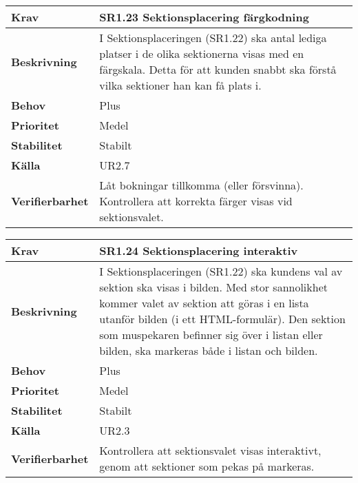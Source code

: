 \documentclass[a4paper, twoside, 11pt, titlepage]{article}
\begin{document}
	\begin{tabular} { p{2.6cm} p{12.5cm} }
		\hline
		\sffamily\textbf{Krav} & \sffamily\textbf{SR1.23 Sektionsplacering färgkodning } \\
		\hline
		\sffamily\textbf{Beskrivning} & I Sektionsplaceringen (SR1.22) ska antal lediga platser i de olika sektionerna visas med en färgskala. Detta för att kunden snabbt ska förstå vilka sektioner han kan få plats i.  \\
		\hline
		\sffamily\textbf{Behov} & Plus  \\
		\hline
		\sffamily\textbf{Prioritet} & Medel  \\
		\hline
		\sffamily\textbf{Stabilitet} & Stabilt  \\
		\hline
		\sffamily\textbf{Källa} & UR2.7  \\
		\hline
		\sffamily\textbf{Verifierbarhet} & Låt bokningar tillkomma (eller försvinna). Kontrollera att korrekta färger visas vid sektionsvalet.  \\
		\hline
	\end{tabular}
	\vspace{6mm}

	\begin{tabular} { p{2.6cm} p{12.5cm} }
		\hline
		\sffamily\textbf{Krav} & \sffamily\textbf{SR1.24 Sektionsplacering interaktiv } \\
		\hline
		\sffamily\textbf{Beskrivning} & I Sektionsplaceringen (SR1.22) ska kundens val av sektion ska visas i bilden. Med stor sannolikhet kommer valet av sektion att göras i en lista utanför bilden (i ett HTML-formulär). Den sektion som muspekaren befinner sig över i listan eller bilden, ska markeras både i listan och bilden.  \\
		\hline
		\sffamily\textbf{Behov} & Plus  \\
		\hline
		\sffamily\textbf{Prioritet} & Medel  \\
		\hline
		\sffamily\textbf{Stabilitet} & Stabilt  \\
		\hline
		\sffamily\textbf{Källa} & UR2.3  \\
		\hline
		\sffamily\textbf{Verifierbarhet} & Kontrollera att sektionsvalet visas interaktivt, genom att sektioner som pekas på markeras.  \\
		\hline
	\end{tabular}
	\vspace{6mm}
\end{document}
